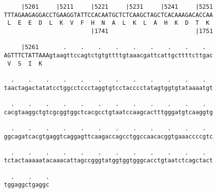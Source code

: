 \documentclass{article}
\begin{document}
\begin{Verbatim}
     |5201     |5211     |5221     |5231     |5241     |5251
TTTAGAAGAGGACCTGAAGGTATTCCACAATGCTCTCAAGCTAGCTCACAAAGACACCAA
 L  E  E  D  L  K  V  F  H  N  A  L  K  L  A  H  K  D  T  K 
                         |1741                         |1751
  
     |5261       .    .    .    .    .    .    .    .    .  
AGTTTCTATTAAAgtaagttccagtctgtgttttgtaaacgattcattgcttttcttgac
 V  S  I  K                                                 
  
  .    .    .    .    .    .    .    .    .    .    .    .  
taactagactatatcctggcctccctaggtgtcctacccctatagtggtgtataaaatgt
  
  .    .    .    .    .    .    .    .    .    .    .    .  
cacgtaaggctgtcgcggtggctcacgcctgtaatccaagcactttgggatgtcaaggtg
  
  .    .    .    .    .    .    .    .    .    .    .    .  
ggcagatcacgtgaggtcaggagttcaagaccagcctggccaacacggtgaaaccccgtc
  
  .    .    .    .    .    .    .    .    .    .    .    .  
tctactaaaaatacaaacattagccgggtatggtggtgggcacctgtaatctcagctact
  
  .    .    .
tggaggctgaggc
\end{Verbatim}
\newpage
\end{document}

